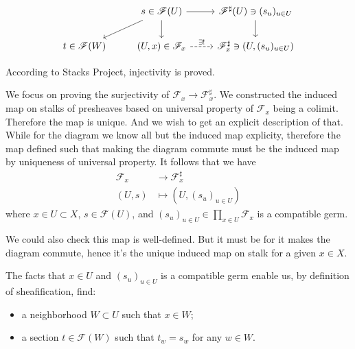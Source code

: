 \[\begin{tikzcd}
	& {s\in\mathscr F(U)} & {\mathscr F^{\sharp}(U)\ni (s_u)_{u\in U}} \\
	{t\in\mathscr F(W)} & {(U,x)\in \mathscr F_x} & {\mathscr F_x^{\sharp}\ni (U,(s_u)_{u\in U})}
	\arrow[from=1-2, to=1-3]
	\arrow[from=1-2, to=2-2]
	\arrow[from=1-3, to=2-3]
	\arrow["{\exists !}", dashed, from=2-2, to=2-3]
	\arrow[from=1-2, to=2-1]
\end{tikzcd}\]

According to Stacks Project, injectivity is proved. 

We focus on proving the surjectivity of $\mathscr F_x\to \mathscr F^{\sharp}_x$. We constructed the induced map on stalks of presheaves based on universal property of $\mathscr F_x$ being a colimit. Therefore the map is unique. And we wish to get an explicit description of that. While for the diagram we know all but the induced map explicity, therefore the map defined such that making the diagram commute must be the induced map by uniqueness of universal property. It follows that we have 
\begin{align*}
    \mathscr F_x &\to \mathscr F^{\sharp}_x \\
    (U,s) &\mapsto (U, (s_u)_{u\in U})
\end{align*} where $x\in U\subset X$, $s\in \mathscr F(U)$, and $(s_u)_{u\in U}\in \prod_{x\in U} \mathscr F_x$ is a compatible germ. 

We could also check this map is well-defined. But it must be for it makes the diagram commute, hence it's the unique induced map on stalk for a given $x\in X$.

The facts that $x\in U$ and $(s_u)_{u\in U}$ is a compatible germ enable us, by definition of sheafification, find: \begin{itemize}
    \item a neighborhood $W\subset U$ such that $x\in W$;
    \item a section $t\in\mathscr F(W)$ such that 
    $t_w=s_w$ for any $w\in W$.
\end{itemize}

